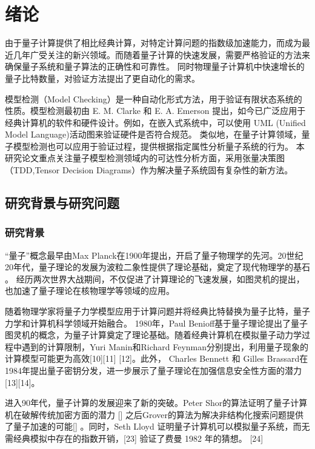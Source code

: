 \chapter{绪论}
由于量子计算提供了相比经典计算，对特定计算问题的指数级加速能力，而成为最近几年广受关注的新兴领域。而随着量子计算的快速发展，需要严格验证的方法来确保量子系统和量子算法的正确性和可靠性。
同时物理量子计算机中快速增长的量子比特数量，对验证方法提出了更自动化的需求。

模型检测（Model Checking）是一种自动化形式方法，用于验证有限状态系统的性质。模型检测最初由 E. M. Clarke 和 E. A. Emerson 提出\citep{Emerson_1980,Clarke,Clarke_1986}，如今已广泛应用于经典计算机的软件和硬件设计。例如，在嵌入式系统中，可以使用 UML (Unified Model Language)活动图来验证硬件是否符合规范\citep{Grobelna_2015}。
类似地，在量子计算领域，量子模型检测也可以应用于验证过程，提供根据指定属性分析量子系统的行为。 本研究论文重点关注量子模型检测领域内的可达性分析方面，采用张量决策图（TDD,Tensor Decision Diagrams）作为解决量子系统固有复杂性的新方法。


\section{研究背景与研究问题}
\subsection{研究背景}
“量子”概念最早由Max Planck在1900年提出，开启了量子物理学的先河\citep{planck1901law}。20世纪20年代，量子理论的发展为波粒二象性提供了理论基础，奠定了现代物理学的基石
\citep{bhatta2020plurality}。
经历两次世界大战期间，不仅促进了计算理论的飞速发展，如图灵机的提出\citep{hodges2014alan}，也加速了量子理论在核物理学等领域的应用\citep{maartensson2006manhattan}。

随着物理学家将量子力学模型应用于计算问题并将经典比特替换为量子比特，量子力学和计算机科学领域开始融合。 1980年，Paul Benioff基于量子理论提出了量子图灵机的概念，为量子计算奠定了理论基础\citep{benioff1980computer}。随着经典计算机在模拟量子动力学过程中遇到的计算限制，Yuri Manin和Richard Feynman分别提出，利用量子现象的计算模型可能更为高效[10][11] [12]。此外， Charles Bennett 和 Gilles Brassard在1984年提出量子密钥分发，进一步展示了量子理论在加强信息安全性方面的潜力 [13][14]。


进入90年代，量子计算的发展迎来了新的突破。Peter Shor的算法证明了量子计算机在破解传统加密方面的潜力 [] 之后Grover的算法为解决非结构化搜索问题提供了量子加速的可能[] 。同时，Seth Lloyd 证明量子计算机可以模拟量子系统，而无需经典模拟中存在的指数开销，[23] 验证了费曼 1982 年的猜想。 [24]

